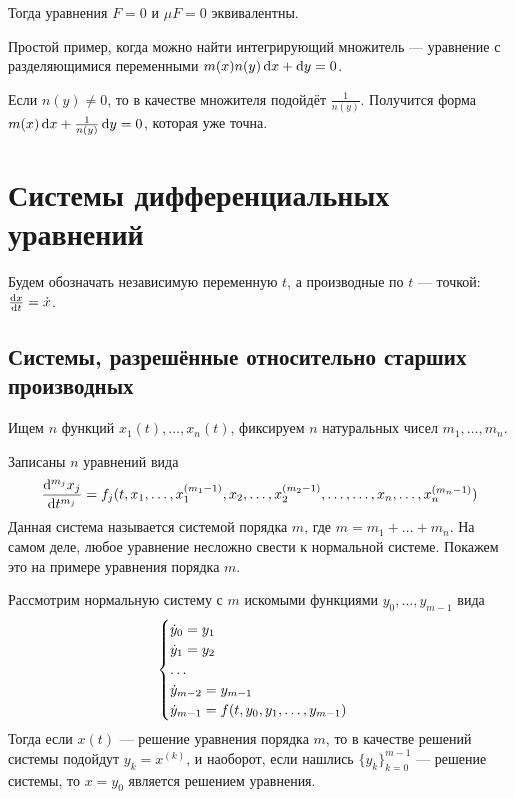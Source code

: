 \documentclass[a4paper]{report}
\begin{document}
    Тогда уравнения $F = 0$ и $\mu F = 0$ эквивалентны.

    Простой пример, когда можно найти интегрирующий множитель --- уравнение с разделяющимися переменными $m(x)n(y)\operatorname{d}\! x + \operatorname{d}\! y = 0$.

    Если $n(y) \ne 0$, то в качестве множителя подойдёт $\frac{1}{n(y)}$.
    Получится форма $m(x)\operatorname{d}\! x + \frac{1}{n(y)}\operatorname{d}\! y = 0$, которая уже точна.


    \chapter{Системы дифференциальных уравнений}
    Будем обозначать независимую переменную $t$, а производные по $t$ --- точкой: $\frac{\operatorname{d}\! x}{\operatorname{d}\! t} = \dot{x}$.


    \section{Системы, разрешённые относительно старших производных}
    Ищем $n$ функций $x_1(t), \dots, x_n(t)$, фиксируем $n$ натуральных чисел $m_1, \dots, m_n$.

    Записаны $n$ уравнений вида
    \[\frac{\operatorname{d}\!^{m_j}x_j}{\operatorname{d}\! t^{m_j}} = f_j(t, x_1, \dots, x_1^{(m_1 - 1)}, x_2, \dots, x_2^{(m_2 - 1)}, \dots, \dots, x_n, \dots, x_n^{(m_n - 1)})\]
    Данная система называется системой порядка $m$, где $m = m_1 + \dots + m_n$.
    На самом деле, любое уравнение несложно свести к нормальной системе.
    Покажем это на примере уравнения порядка $m$.

    Рассмотрим нормальную систему с $m$ искомыми функциями $y_0, \dots, y_{m-1}$ вида
    \[\begin{cases}\dot{y}_0 = y_1 \\ \dot{y}_1 = y_2 \\ \dots \\ \dot{y}_{m - 2} = y_{m-1} \\ \dot{y}_{m-1} = f(t, y_0, y_1, \dots, y_{m-1})\end{cases}\]
    Тогда если $x(t)$ --- решение уравнения порядка $m$, то в качестве решений системы подойдут $y_k = x^{(k)}$, и наоборот, если нашлись $\{y_k\}_{k = 0}^{m - 1}$ --- решение системы, то $x = y_0$ является решением уравнения.
\end{document}
